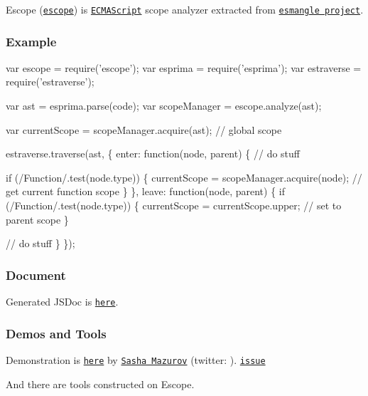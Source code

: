 Escope (\href{http://github.com/estools/escope}{\tt escope}) is \href{http://www.ecma-international.org/publications/standards/Ecma-262.htm}{\tt E\+C\+M\+A\+Script} scope analyzer extracted from \href{http://github.com/estools/esmangle}{\tt esmangle project}.

\href{https://travis-ci.org/estools/escope}{\tt }

\subsubsection*{Example}


\begin{DoxyCode}
var escope = require('escope');
var esprima = require('esprima');
var estraverse = require('estraverse');

var ast = esprima.parse(code);
var scopeManager = escope.analyze(ast);

var currentScope = scopeManager.acquire(ast);   // global scope

estraverse.traverse(ast, \{
    enter: function(node, parent) \{
        // do stuff

        if (/Function/.test(node.type)) \{
            currentScope = scopeManager.acquire(node);  // get current function scope
        \}
    \},
    leave: function(node, parent) \{
        if (/Function/.test(node.type)) \{
            currentScope = currentScope.upper;  // set to parent scope
        \}

        // do stuff
    \}
\});
\end{DoxyCode}


\subsubsection*{Document}

Generated J\+S\+Doc is \href{http://estools.github.io/escope/}{\tt here}.

\subsubsection*{Demos and Tools}

Demonstration is \href{http://mazurov.github.io/escope-demo/}{\tt here} by \href{https://github.com/mazurov}{\tt Sasha Mazurov} (twitter\+: \href{http://twitter.com/mazurov}{\tt }). \href{https://github.com/estools/escope/issues/14}{\tt issue}



And there are tools constructed on Escope.


